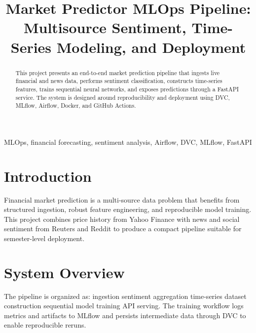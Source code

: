\documentclass[conference]{IEEEtran}
\title{Market Predictor MLOps Pipeline: Multisource Sentiment, Time-Series Modeling, and Deployment}
\author{\IEEEauthorblockN{Student Name}
\IEEEauthorblockA{Department of Computer Science\\
University Name\\
Email: student@example.com}}
\begin{document}
\maketitle

\begin{abstract}
This project presents an end-to-end market prediction pipeline that ingests live financial and news data, performs sentiment classification, constructs time-series features, trains sequential neural networks, and exposes predictions through a FastAPI service. The system is designed around reproducibility and deployment using DVC, MLflow, Airflow, Docker, and GitHub Actions.
\end{abstract}

\begin{IEEEkeywords}
MLOps, financial forecasting, sentiment analysis, Airflow, DVC, MLflow, FastAPI
\end{IEEEkeywords}

\section{Introduction}
Financial market prediction is a multi-source data problem that benefits from structured ingestion, robust feature engineering, and reproducible model training. This project combines price history from Yahoo Finance with news and social sentiment from Reuters and Reddit to produce a compact pipeline suitable for semester-level deployment.

\section{System Overview}
The pipeline is organized as: ingestion \rightarrow sentiment aggregation \rightarrow time-series dataset construction \rightarrow sequential model training \rightarrow API serving. The training workflow logs metrics and artifacts to MLflow and persists intermediate data through DVC to enable reproducible reruns.
\end{document}
